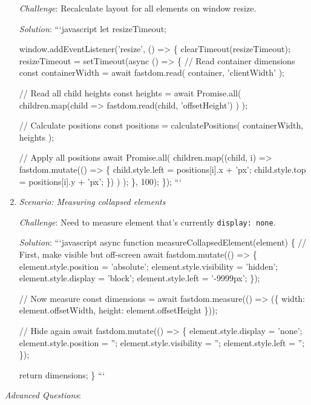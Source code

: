 \documentclass[11pt]{article}
\begin{document}
\begin{enumerate}
\emph{Challenge}: Recalculate layout for all elements on window resize.

\emph{Solution}:
```javascript
let resizeTimeout;

window.addEventListener('resize', () => \{
  clearTimeout(resizeTimeout);
  resizeTimeout = setTimeout(async () => \{
    // Read container dimensions
    const containerWidth = await fastdom.read(
      container,
      'clientWidth'
    );

// Read all child heights
const heights = await Promise.all(
  children.map(child => 
    fastdom.read(child, 'offsetHeight')
  )
);

// Calculate positions
const positions = calculatePositions(
  containerWidth,
  heights
);

    // Apply all positions
    await Promise.all(
      children.map((child, i) =>
        fastdom.mutate(() => \{
          child.style.left = positions[i].x + 'px';
          child.style.top = positions[i].y + 'px';
        \})
      )
    );
  \}, 100);
\});
```

\item \emph{Scenario: Measuring collapsed elements}

\emph{Challenge}: Need to measure element that's currently \texttt{display: none}.

\emph{Solution}:
```javascript
async function measureCollapsedElement(element) \{
  // First, make visible but off-screen
  await fastdom.mutate(() => \{
    element.style.position = 'absolute';
    element.style.visibility = 'hidden';
    element.style.display = 'block';
    element.style.left = '-9999px';
  \});

// Now measure
const dimensions = await fastdom.measure(() => (\{
  width: element.offsetWidth,
  height: element.offsetHeight
\}));

// Hide again
await fastdom.mutate(() => \{
  element.style.display = 'none';
  element.style.position = '';
  element.style.visibility = '';
  element.style.left = '';
\});

  return dimensions;
\}
```
\end{enumerate}

\emph{Advanced Questions}:
\end{document}
